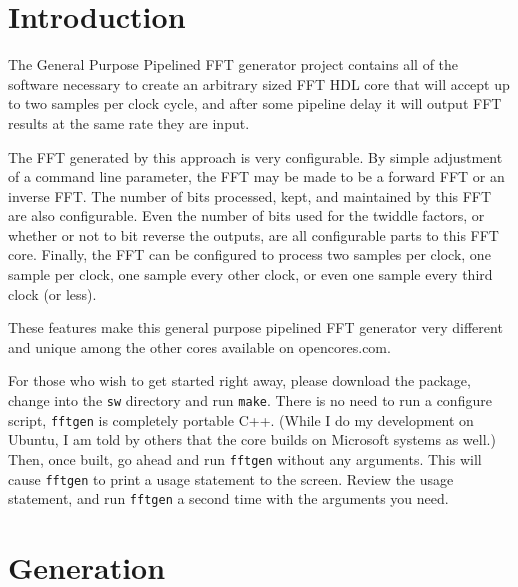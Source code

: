\documentclass{gqtekspec}
\begin{document}
\chapter{Introduction}
\setcounter{page}{1}

The General Purpose Pipelined FFT generator project contains all of the
software necessary to create an arbitrary sized FFT HDL core that will
accept up to two samples per clock cycle, and after some pipeline delay
it will output FFT results at the same rate they are input.

The FFT generated by this approach is very configurable.  By simple adjustment
of a command line parameter, the FFT may be made to be a forward FFT or an
inverse FFT.  The number of bits processed, kept, and maintained by this
FFT are also configurable.  Even the number of bits used for the twiddle
factors, or whether or not to bit reverse the outputs, are all configurable
parts to this FFT core.  Finally, the FFT can be configured to process two
samples per clock, one sample per clock, one sample every other clock, or even
one sample every third clock (or less).

These features make this general purpose pipelined FFT generator very
different and unique among the other cores available on opencores.com.

For those who wish to get started right away, please download the package,
change into the {\tt sw} directory and run {\tt make}.  There is no need to
run a configure script, {\tt fftgen} is completely portable C++.  (While I
do my development on Ubuntu, I am told by others that the core builds on
Microsoft systems as well.)  Then, once built, go ahead and run {\tt fftgen}
without any arguments.  This will cause {\tt fftgen} to print a usage
statement to the screen.  Review the usage statement, and run {\tt fftgen}
a second time with the arguments you need.


\chapter{Generation}
\end{document}
